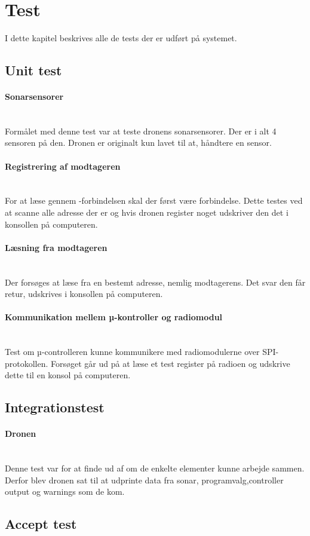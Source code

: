 \documentclass[Main]{subfiles}
\begin{document}
\section{Test}
I dette kapitel beskrives alle de tests der er udført på systemet.

\subsection{Unit test}

\paragraph{Sonarsensorer}\mbox{}\\
Formålet med denne test var at teste dronens sonarsensorer. Der er i alt 4 sensoren på den. Dronen er originalt kun lavet til at, håndtere en sensor.

\paragraph{Registrering af modtageren}\mbox{}\\
For at læse gennem \itoc -forbindelsen skal der først være forbindelse. Dette testes ved at scanne alle adresse der er og hvis dronen register noget udskriver den det i konsollen på computeren.

\paragraph{Læsning fra modtageren}\mbox{}\\
Der forsøges at læse fra en bestemt adresse, nemlig modtagerens.
Det svar den får retur, udskrives i konsollen på computeren.

\paragraph{Kommunikation mellem µ-kontroller og radiomodul}\mbox{}\\
Test om µ-controlleren kunne kommunikere med radiomodulerne over SPI-protokollen. Forsøget går ud på at læse et test register på radioen og udskrive dette til en konsol på computeren.

\subsection{Integrationstest}
\paragraph{Dronen}\mbox{}\\
Denne test var for at finde ud af om de enkelte elementer kunne arbejde sammen. Derfor blev dronen sat til at udprinte data fra sonar, programvalg,controller output og warnings som de kom.


\subsection{Accept test}
\end{document}
